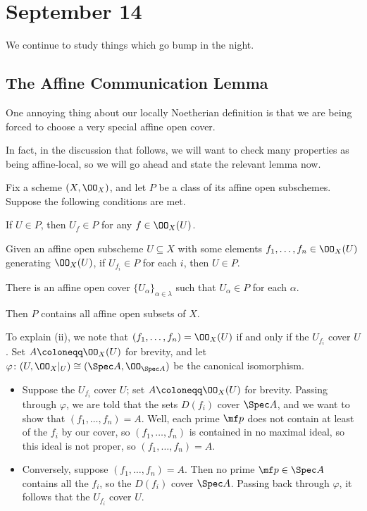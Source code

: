 \documentclass[../notes.tex]{subfiles}
\begin{document}
\section{September 14}

We continue to study things which go bump in the night.

\subsection{The Affine Communication Lemma}
One annoying thing about our locally Noetherian definition is that we are being forced to choose a very special affine open cover.

In fact, in the discussion that follows, we will want to check many properties as being affine-local, so we will go ahead and state the relevant lemma now.
\begin{lemma} \label{lem:affine-comm}
	Fix a scheme $(X,\OO_X)$, and let $P$ be a class of its affine open subschemes. Suppose the following conditions are met.
	\begin{listroman}
		\item If $U\in P$, then $U_f\in P$ for any $f\in\OO_X(U)$.
		\item Given an affine open subscheme $U\subseteq X$ with some elements $f_1,\ldots,f_n\in\OO_X(U)$ generating $\OO_X(U)$, if $U_{f_i}\in P$ for each $i$, then $U\in P$.
		\item There is an affine open cover $\{U_\alpha\}_{\alpha\in\lambda}$ such that $U_\alpha\in P$ for each $\alpha$.
	\end{listroman}
	Then $P$ contains all affine open subsets of $X$.
\end{lemma}
\begin{remark} \label{rem:topological-affine-comm-ii}
	To explain (ii), we note that $(f_1,\ldots,f_n)=\OO_X(U)$ if and only if the $U_{f_i}$ cover $U$. Set $A\coloneqq\OO_X(U)$ for brevity, and let $\varphi\colon(U,\OO_X|_U)\cong(\Spec A,\OO_{\Spec A})$ be the canonical isomorphism.
	\begin{itemize}
		\item Suppose the $U_{f_i}$ cover $U$; set $A\coloneqq\OO_X(U)$ for brevity. Passing through $\varphi$, we are told that the sets $D(f_i)$ cover $\Spec A$, and we want to show that $(f_1,\ldots,f_n)=A$. Well, each prime $\mf p$ does not contain at least of the $f_i$ by our cover, so $(f_1,\ldots,f_n)$ is contained in no maximal ideal, so this ideal is not proper, so $(f_1,\ldots,f_n)=A$.
		\item Conversely, suppose $(f_1,\ldots,f_n)=A$. Then no prime $\mf p\in\Spec A$ contains all the $f_i$, so the $D(f_i)$ cover $\Spec A$. Passing back through $\varphi$, it follows that the $U_{f_i}$ cover $U$.
	\end{itemize}
\end{remark}
\end{document}
